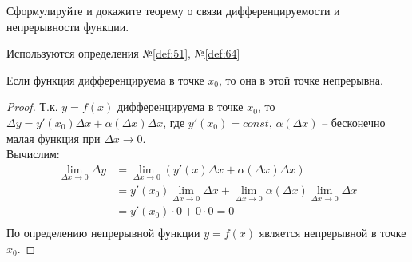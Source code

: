 \begin{question}
    Сформулируйте и докажите теорему о связи дифференцируемости и непрерывности функции.
\end{question}
\begin{used}
    Используются определения №\ref{def:51}, №\ref{def:64}
\end{used}
\begin{theorem}
    Если функция дифференцируема в точке $x_0$, то она в этой точке непрерывна.
\end{theorem}
\begin{proof}
    Т.к. $y = f(x)$ дифференцируема в точке $x_0$, то $\Delta y = y'(x_0) \Delta x + \alpha(\Delta x) \Delta x$, где $y'(x_0) = const$, $\alpha(\Delta x)$ -- бесконечно малая функция при  $\Delta x \to 0$. \\
    Вычислим:
    \begin{align*}
        \lim_{\Delta x \to 0} \Delta y &= \lim_{\Delta x \to 0} (y'(x) \Delta x + \alpha(\Delta x) \Delta x) \\
            &= y'(x_0) \lim_{\Delta x \to 0} \Delta x + \lim_{\Delta x \to 0} \alpha(\Delta x) \lim_{\Delta x \to 0} \Delta x \\
            &= y'(x_0) \cdot 0 + 0 \cdot 0 = 0 \\
    \end{align*}
    По определению непрерывной функции $y = f(x)$ является непрерывной в точке $x_0$.
\end{proof}
\pagebreak



